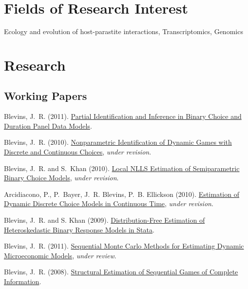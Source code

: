 \documentclass[10pt,letterpaper]{article}
\renewenvironment{itemize}{
  \begin{list}{}{
    \setlength{\leftmargin}{1.5em}
    \setlength{\itemsep}{0.25em}
    \setlength{\parskip}{0pt}
    \setlength{\parsep}{0.25em}
  }
}{
  \end{list}
}
\begin{document}
\section*{Fields of Research Interest}

Ecology and evolution of host-parastite interactions, Transcriptomics, Genomics

\section*{Research}

\subsection*{Working Papers}

\begin{itemize}
\item Blevins, J.~R. (2011).
  \href{http://jblevins.org/research/panel}{Partial Identification and Inference in Binary Choice and Duration Panel Data Models}.
\item Blevins, J.~R. (2010).
  \href{http://jblevins.org/research/dcident}{Nonparametric Identification of Dynamic Games with Discrete and Continuous Choices}, \textit{under revision}.
\item Blevins, J.~R. and S.~Khan (2010).
  \href{http://jblevins.org/research/lnlls}{Local NLLS Estimation of Semiparametric Binary Choice Models}, \textit{under revision}.
\item Arcidiacono, P., P.~Bayer, J.~R. Blevins, P.~B. Ellickson (2010).
  \href{http://jblevins.org/research/abbe}{Estimation of Dynamic Discrete Choice Models in Continuous Time}, \textit{under revision}.
\item Blevins, J.~R. and S. Khan (2009).
  \href{http://jblevins.org/research/dfbr}{Distribution-Free Estimation of Heteroskedastic Binary Response Models in Stata}.
\item Blevins, J.~R. (2011).
  \href{http://jblevins.org/research/smcdmm}{Sequential Monte Carlo Methods for Estimating Dynamic Microeconomic Models},
  \textit{under review}.
\item Blevins, J.~R. (2008).
  \href{http://jblevins.org/research/seqgame}{Structural Estimation of Sequential Games of Complete Information}.
\end{itemize}

%
\end{document}
